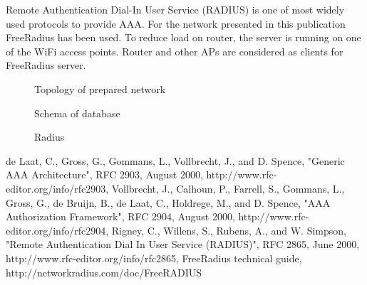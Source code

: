 \documentclass{llncs}
\begin{document}
Remote Authentication Dial-In User Service (RADIUS) \cite{rfc2865} is one of
most widely used protocols to provide AAA. For the network presented in this
publication FreeRadius \cite{freeRadius} has been used. To reduce load on
router, the server is running on one of the WiFi access points. Router and other
APs are considered as clients for FreeRadius server. 

\begin{figure}
\vspace{-15pt}
\caption{Topology of prepared network}
\end{figure}

\begin{figure}
\vspace{-15pt}
\caption{Schema of database}
\end{figure}

\begin{figure}
\vspace{-15pt}
\caption{Radius}
\end{figure}

%
%
\begin{thebibliography}{}
%
de Laat, C., Gross, G., Gommans, L., Vollbrecht, J., and D. Spence, "Generic AAA
Architecture", RFC 2903, August 2000, http://www.rfc-editor.org/info/rfc2903,
Vollbrecht, J., Calhoun, P., Farrell, S., Gommans, L., Gross, G., de Bruijn, B.,
de Laat, C., Holdrege, M., and D. Spence, "AAA Authorization Framework", RFC
2904, August 2000, http://www.rfc-editor.org/info/rfc2904,
Rigney, C., Willens, S., Rubens, A., and W. Simpson, "Remote  Authentication
Dial In User Service (RADIUS)", RFC 2865, June 2000,
http://www.rfc-editor.org/info/rfc2865,
FreeRadius technical guide,
http://networkradius.com/doc/FreeRADIUS%
\end{thebibliography}



\clearpage
{} %
\renewcommand{\indexname}{Author Index}
\printindex
\clearpage
{} %
\renewcommand{\indexname}{Subject Index}

\end{document}
